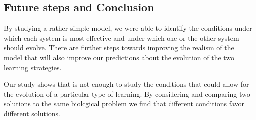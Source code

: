  
\subsection*{Future steps and Conclusion}
 
By studying a rather simple model, we were able to identify the conditions under which each system is most effective and under which one or the other system should evolve. There are further steps towards improving the realism of the model that will also improve our predictions about the evolution of the two learning strategies. 

Our study shows that is not enough to study the conditions that could allow for the evolution of a particular type of learning. By considering and comparing two solutions to the same biological problem we find that different conditions favor different solutions. %


